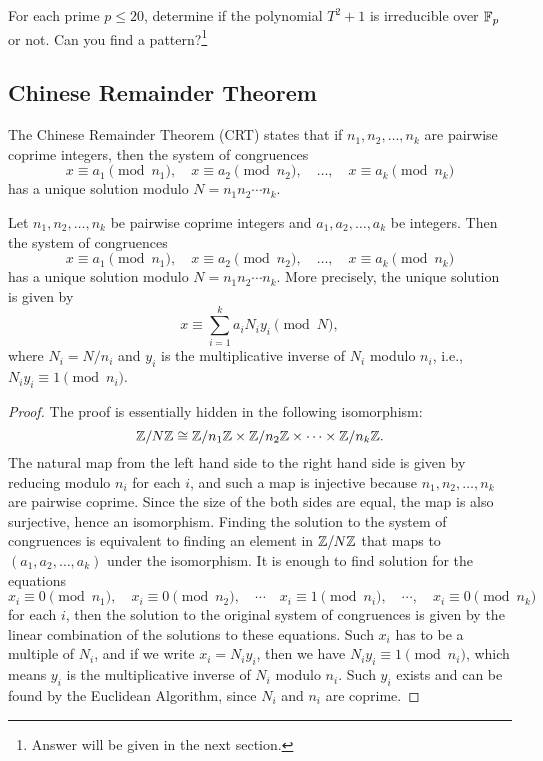 \begin{exercise}
    For each prime $p \le 20$, determine if the polynomial $T^2 + 1$ is irreducible over $\mathbb{F}_p$ or not. Can you find a pattern?\footnote{Answer will be given in the next section.}
\end{exercise}

\subsection{Chinese Remainder Theorem}
\label{subsec:basicnt_crt}

The Chinese Remainder Theorem (CRT) states that if $n_1, n_2, \ldots, n_k$ are pairwise coprime integers, then the system of congruences
\[
    x \equiv a_1 \pmod{n_1}, \quad x \equiv a_2 \pmod{n_2}, \quad \ldots, \quad x \equiv a_k \pmod{n_k}
\]
has a unique solution modulo $N = n_1 n_2 \cdots n_k$.
\begin{theorem}
    \label{thm:crt}
    Let $n_1, n_2, \ldots, n_k$ be pairwise coprime integers and $a_1, a_2, \ldots, a_k$ be integers.
    Then the system of congruences
    \[
        x \equiv a_1 \pmod{n_1}, \quad x \equiv a_2 \pmod{n_2}, \quad \ldots, \quad x \equiv a_k \pmod{n_k}
    \]
    has a unique solution modulo $N = n_1 n_2 \cdots n_k$.
    More precisely, the unique solution is given by
    \[
        x \equiv \sum_{i=1}^k a_i N_i y_i \pmod{N},
    \]
    where $N_i = N / n_i$ and $y_i$ is the multiplicative inverse of $N_i$ modulo $n_i$, i.e., $N_i y_i \equiv 1 \pmod{n_i}$.
\end{theorem}

\begin{proof}
    The proof is essentially hidden in the following isomorphism:
    \[
        \mathbb{Z} / N\mathbb{Z} \cong \mathbb{Z} / n_1\mathbb{Z} \times \mathbb{Z} / n_2\mathbb{Z} \times \cdots \times \mathbb{Z} / n_k\mathbb{Z}.
    \]
    The natural map from the left hand side to the right hand side is given by reducing modulo $n_i$ for each $i$, and such a map is injective because $n_1, n_2, \ldots, n_k$ are pairwise coprime.
    Since the size of the both sides are equal, the map is also surjective, hence an isomorphism.
    Finding the solution to the system of congruences is equivalent to finding an element in $\mathbb{Z} / N\mathbb{Z}$ that maps to $(a_1, a_2, \ldots, a_k)$ under the isomorphism.
    It is enough to find solution for the equations
    \[
        x_i \equiv 0 \pmod{n_1}, \quad x_i \equiv 0 \pmod{n_2}, \quad \cdots \quad x_i \equiv 1 \pmod{n_i}, \quad \cdots, \quad x_i \equiv 0 \pmod{n_k}
    \]
    for each $i$, then the solution to the original system of congruences is given by the linear combination of the solutions to these equations.
    Such $x_i$ has to be a multiple of $N_i$, and if we write $x_i = N_i y_i$, then we have $N_i y_i \equiv 1 \pmod{n_i}$, which means $y_i$ is the multiplicative inverse of $N_i$ modulo $n_i$.
    Such $y_i$ exists and can be found by the Euclidean Algorithm, since $N_i$ and $n_i$ are coprime.
\end{proof}

